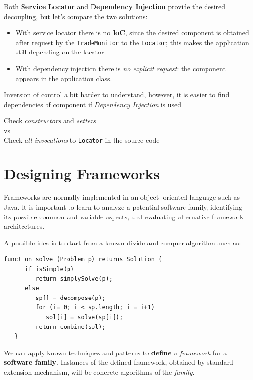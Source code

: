 Both \textbf{Service Locator} and \textbf{Dependency Injection} provide
the desired decoupling, but let's compare the two solutions: 
\begin{itemize}
   \item 
   With service locator there is no \textbf{IoC}, since the desired component is obtained
   after request by the \texttt{TradeMonitor} to the \texttt{Locator};
   this makes the application still depending on the locator.
   \item With dependency injection there is \textit{no explicit request}: the
   component appears in the application class.
\end{itemize}
Inversion of control a bit harder to understand, however,
it is easier to find dependencies of component if \textit{Dependency Injection} is used
\begin{center}
   \color{darkgray}
   Check \textit{constructors} and \textit{setters}\\vs\\Check \textit{all invocations} to
   \texttt{Locator} in the source code
\end{center}

\section{Designing Frameworks}
Frameworks are normally implemented in an object-
oriented language such as Java.
It is important to learn to analyze a potential software family, identifying
its possible common and variable aspects, and evaluating
alternative framework architectures.
\nl

A possible idea is to start from a known divide-and-conquer algorithm such as:
\begin{lstlisting}[label={lst:divideandconquer_example},caption={Example pseudocode of a Divide-and-Conquer algorithm}]
   function solve (Problem p) returns Solution { 
      if isSimple(p)
         return simplySolve(p);
      else
         sp[] = decompose(p);
         for (i= 0; i < sp.length; i = i+1)
            sol[i] = solve(sp[i]);
         return combine(sol);
   }
\end{lstlisting}
We can apply known techniques and patterns to \textbf{define} a
\textit{framework} for a \textbf{software family}.
Instances of the defined framework, obtained by standard
extension mechanism, 
will be concrete algorithms of the \textit{family}.

